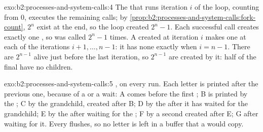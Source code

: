 \begin{solution}{exo:b2:processes-and-system-calls:4}
The  that runs iteration $i$ of the loop, counting from 0, executes the remaining calls; by
\cref{prop:b2:processes-and-system-calls:fork-count}, $2^n$  exist at the end, so the loop created
$2^n - 1$. Each successful call creates exactly one , so  was called $2^n - 1$ times. A 
created at iteration $i$ makes one  at each of the iterations $i + 1, \dots, n - 1$: it has none exactly when
$i = n - 1$. There are $2^{n-1}$  alive just before the last iteration, so $2^{n-1}$ are created by it:
half of the final  have no children.
\end{solution}

\begin{solution}{exo:b2:processes-and-system-calls:5}
, on every run. Each letter is printed after the previous one, because of a  or a wait: A comes
before the first ; B is printed by the ; C by the grandchild, created after B; D by the  after it has
waited for the grandchild; E by the  after waiting for the ; F by a second  created after E; G after
waiting for it. Every  flushes, so no letter is left in a buffer that a  would copy.
\end{solution}

